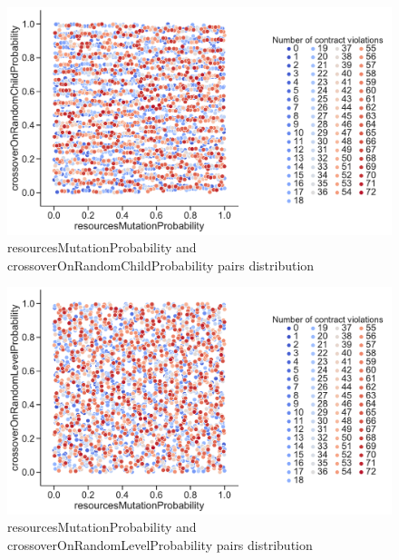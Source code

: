 \begin{figure}
	\centering
	\includegraphics[width=\textwidth]{images/PairsDistr/resourcesMutationProbability_crossoverOnRandomChildProbability.pdf}
	\caption[resourcesMutationProbability and crossoverOnRandomChildProbability pairs distribution]{resourcesMutationProbability and crossoverOnRandomChildProbability pairs distribution}       
	\label{fig:resourcesMutationProbability_crossoverOnRandomChildProbability_pair}
\end{figure}
\clearpage
\begin{figure}
	\centering
	\includegraphics[width=\textwidth]{images/PairsDistr/resourcesMutationProbability_crossoverOnRandomLevelProbability.pdf}
	\caption[resourcesMutationProbability and crossoverOnRandomLevelProbability pairs distribution]{resourcesMutationProbability and crossoverOnRandomLevelProbability pairs distribution}       
	\label{fig:resourcesMutationProbability_crossoverOnRandomLevelProbability_pair}
\end{figure}
\clearpage
